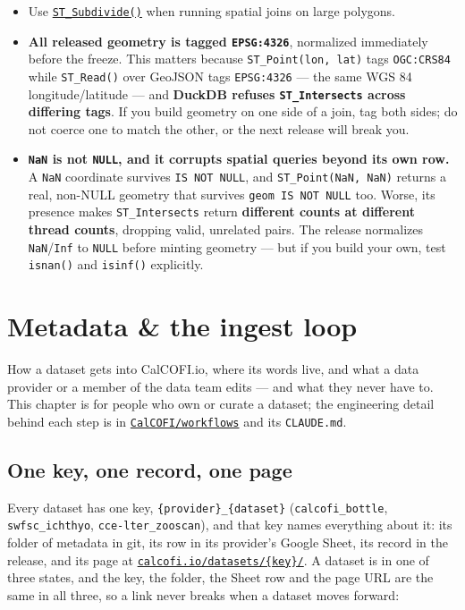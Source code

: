 \documentclass[
  letterpaper,
  DIV=11,
  numbers=noendperiod]{scrreprt}
\begin{document}
\begin{itemize}
\item
  Use
  \href{https://postgis.net/docs/ST_Subdivide.html}{\texttt{ST\_Subdivide()}}
  when running spatial joins on large polygons.
\item
  \textbf{All released geometry is tagged \texttt{EPSG:4326}},
  normalized immediately before the freeze. This matters because
  \texttt{ST\_Point(lon,\ lat)} tags \texttt{OGC:CRS84} while
  \texttt{ST\_Read()} over GeoJSON tags \texttt{EPSG:4326} --- the same
  WGS 84 longitude/latitude --- and \textbf{DuckDB refuses
  \texttt{ST\_Intersects} across differing tags}. If you build geometry
  on one side of a join, tag both sides; do not coerce one to match the
  other, or the next release will break you.
\item
  \textbf{\texttt{NaN} is not \texttt{NULL}, and it corrupts spatial
  queries beyond its own row.} A \texttt{NaN} coordinate survives
  \texttt{IS\ NOT\ NULL}, and \texttt{ST\_Point(NaN,\ NaN)} returns a
  real, non-NULL geometry that survives \texttt{geom\ IS\ NOT\ NULL}
  too. Worse, its presence makes \texttt{ST\_Intersects} return
  \textbf{different counts at different thread counts}, dropping valid,
  unrelated pairs. The release normalizes \texttt{NaN}/\texttt{Inf} to
  \texttt{NULL} before minting geometry --- but if you build your own,
  test \texttt{isnan()} and \texttt{isinf()} explicitly.
\end{itemize}


\chapter{Metadata \& the ingest loop}\label{sec-metadata}

How a dataset gets into CalCOFI.io, where its words live, and what a
data provider or a member of the data team edits --- and what they never
have to. This chapter is for people who own or curate a dataset; the
engineering detail behind each step is in
\href{https://github.com/CalCOFI/workflows}{\texttt{CalCOFI/workflows}}
and its \texttt{CLAUDE.md}.

\section{One key, one record, one
page}\label{one-key-one-record-one-page}

Every dataset has one key, \texttt{\{provider\}\_\{dataset\}}
(\texttt{calcofi\_bottle}, \texttt{swfsc\_ichthyo},
\texttt{cce-lter\_zooscan}), and that key names everything about it: its
folder of metadata in git, its row in its provider's Google Sheet, its
record in the release, and its page at
\href{https://calcofi.io/datasets/}{\texttt{calcofi.io/datasets/\{key\}/}}.
A dataset is in one of three states, and the key, the folder, the Sheet
row and the page URL are the same in all three, so a link never breaks
when a dataset moves forward:
\end{document}

